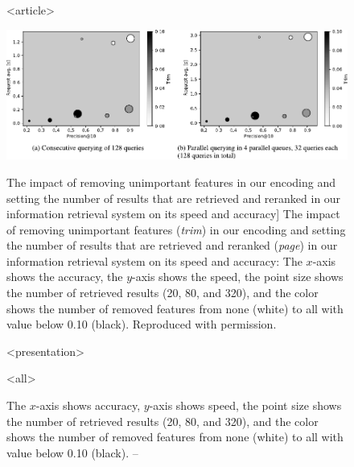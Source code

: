 \begin{figure}

\mode
<article>

\includegraphics{scaletext-speed}

\vspace{-0.5cm}

\caption
  [The impact of removing unimportant features in our encoding and setting the
   number of results that are retrieved and reranked in our information
   retrieval system on its speed and accuracy]%
  {The impact of removing unimportant features (\emph{trim}) in our encoding and
   setting the number of results that are retrieved and reranked (\emph{page}) in
   our information retrieval system on its speed and accuracy: The
   $x$-axis shows the accuracy, the $y$-axis shows the speed, the point size
   shows the number of retrieved results (20, 80, and 320), and the color shows
   the number of removed features from none (white) to all with value below 0.10
   (black). Reproduced with permission.
   \cite[Figure 2]{rygl2017semantic}}

\protect{}

\mode
<presentation>

\vspace*{-0.5cm}


\caption
  {The $x$-axis shows accuracy, $y$-axis shows speed, the point size
   shows the number of retrieved results (20, 80, and 320), and the color shows
   the number of removed features from none (white) to all with value below 0.10
   (black). -- \textcite[Figure 2]{rygl2017semantic}}

\mode
<all>

\label{fig:dense-retrieval-in-inverted-indices-speed}
\end{figure}

